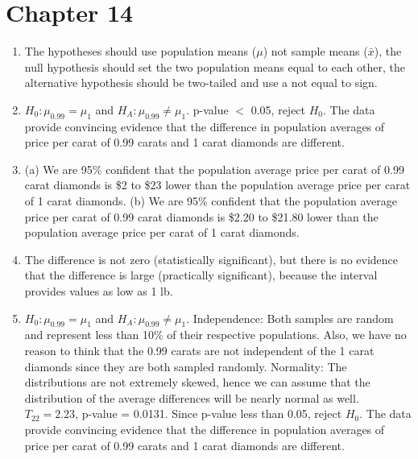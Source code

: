 \documentclass[
  10pt,
  openany]{book}
\providecommand{\tightlist}{%
  \setlength{\itemsep}{0pt}\setlength{\parskip}{0pt}}
\begin{document}
\hypertarget{exercise-solutions-20}{%
\section{Chapter 14}\label{exercise-solutions-20}}

\begin{enumerate}
\def\labelenumi{\arabic{enumi}.}
\tightlist
\item
  The hypotheses should use population means (\(\mu\)) not sample means (\(\bar{x}\)), the null hypothesis should set the two population means equal to each other, the alternative hypothesis should be two-tailed and use a not equal to sign.

  \addtocounter{enumi}{1}
\item
  \(H_0: \mu_{0.99} = \mu_{1}\) and \(H_A: \mu_{0.99} \ne \mu_{1}.\) p-value \(<\) 0.05, reject \(H_0.\) The data provide convincing evidence that the difference in population averages of price per carat of 0.99 carats and 1 carat diamonds are different.

  \addtocounter{enumi}{1}
\item
  (a) We are 95\% confident that the population average price per carat of 0.99 carat diamonds is \$2 to \$23 lower than the population average price per carat of 1 carat diamonds. (b) We are 95\% confident that the population average price per carat of 0.99 carat diamonds is \$2.20 to \$21.80 lower than the population average price per carat of 1 carat diamonds.

  \addtocounter{enumi}{1}
\item
  The difference is not zero (statistically significant), but there is no evidence that the difference is large (practically significant), because the interval provides values as low as 1 lb.

  \addtocounter{enumi}{1}
\item
  \(H_0: \mu_{0.99} = \mu_{1}\) and \(H_A: \mu_{0.99} \ne \mu_{1}\). Independence: Both samples are random and represent less than 10\% of their respective populations. Also, we have no reason to think that the 0.99 carats are not independent of the 1 carat diamonds since they are both sampled randomly. Normality: The distributions are not extremely skewed, hence we can assume that the distribution of the average differences will be nearly normal as well. \(T_{22} = 2.23\), p-value = 0.0131. Since p-value less than 0.05, reject \(H_0\). The data provide convincing evidence that the difference in population averages of price per carat of 0.99 carats and 1 carat diamonds are different.


\end{enumerate}
\end{document}
